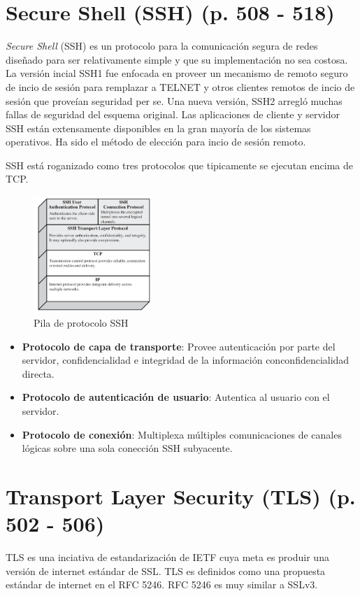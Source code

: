 \documentclass[11pt,letterpaper]{article}
\begin{document}
\section{Secure Shell (SSH) (p. 508 - 518)}
\textit{Secure Shell} (SSH) es un protocolo para la comunicación segura de redes diseñado para ser relativamente
simple y que su implementación no sea costosa. La versión incial SSH1 fue enfocada en proveer un mecanismo de
remoto seguro de incio de sesión para remplazar a TELNET y otros clientes remotos de incio de sesión que
proveían seguridad per se.
Una nueva versión, SSH2  arregló muchas fallas de seguridad del esquema original.
Las aplicaciones de cliente y servidor SSH están extensamente disponibles en la gran mayoría de los sistemas
operativos. Ha sido el método de elección para incio de sesión remoto.

SSH está roganizado como tres protocolos que tipicamente se ejecutan encima de TCP.

\begin{figure}[H]
    \centering
    \includegraphics[width=0.4\textwidth]{assets/2.png}
    \caption{Pila de protocolo SSH}
\end{figure}

\begin{itemize}
    \item \textbf{Protocolo de capa de transporte}: Provee autenticación por parte del servidor,
    confidencialidad e integridad de la información conconfidencialidad directa.
    \item \textbf{Protocolo de autenticación de usuario}: Autentica al usuario con el servidor.
    \item \textbf{Protocolo de conexión}: Multiplexa múltiples comunicaciones de canales lógicas sobre
    una sola conección SSH subyacente.
\end{itemize}


\section{Transport Layer Security (TLS) (p. 502 - 506)}
TLS es una inciativa de estandarización de IETF cuya meta es produir una versión de internet
estándar de SSL. TLS es definidos como una propuesta estándar de internet en el RFC 5246. RFC
5246 es muy similar a SSLv3.
\end{document}
